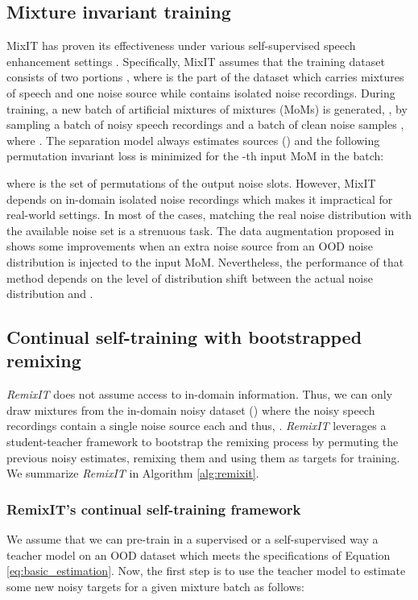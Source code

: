 \documentclass{article}
\begin{document}
\subsection{Mixture invariant training}
\label{sec:remix_method:mixit}
MixIT \cite{mixit} has proven its effectiveness under various self-supervised speech enhancement settings \cite{fujimura2021noisyTargetTRaining,tzinis2021separate}. Specifically, MixIT assumes that the training dataset consists of two portions , where  is the part of the dataset which carries mixtures of speech and one noise source while  contains isolated noise recordings. During training, a new batch of artificial mixtures of mixtures (MoMs) is generated, , by sampling a batch of noisy speech recordings  and a batch of clean noise samples , where . The separation model always estimates  sources () and the following permutation invariant loss is minimized for the -th input MoM in the batch:

where  is the set of permutations of the output noise slots. However, MixIT depends on in-domain isolated noise recordings which makes it impractical for real-world settings. In most of the cases, matching the real noise distribution with the available noise set  is a strenuous task. The data augmentation proposed in \cite{saito2021trainingSEsystemsWNoisyDatasets} shows some improvements when an extra noise source from an OOD noise distribution is injected to the input MoM. Nevertheless, the performance of that method depends on the level of distribution shift between the actual noise distribution and .


\subsection{Continual self-training with bootstrapped remixing}
\label{sec:remix_method:remixit}
\textit{RemixIT} does not assume access to in-domain information. Thus, we can only draw mixtures from the in-domain noisy dataset  () where the noisy speech recordings contain a single noise source each and thus, . \textit{RemixIT} leverages a student-teacher framework to bootstrap the remixing process by permuting the previous noisy estimates, remixing them and using them as targets for training. We summarize \textit{RemixIT} in Algorithm \ref{alg:remixit}.
\subsubsection{RemixIT's continual self-training framework}
\label{sec:remix_method:remixit:student_teacher}
We assume that we can pre-train in a supervised or a self-supervised way a teacher model  on an OOD dataset  which meets the specifications of Equation \ref{eq:basic_estimation}. Now, the first step is to use the teacher model to estimate some new noisy targets for a given mixture batch  as follows:
\end{document}
